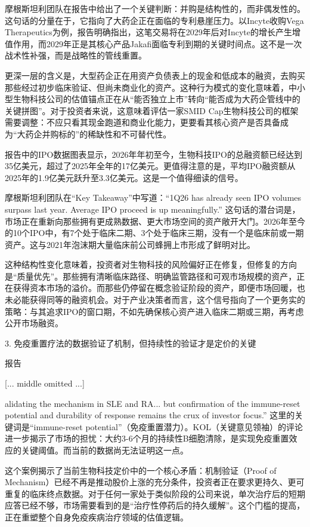 \documentclass[11pt]{ctexart}
\begin{document}
摩根斯坦利团队在报告中给出了一个关键判断：并购是结构性的，而非偶发性的。这句话的分量在于，它指向了大药企正在面临的专利悬崖压力。以Incyte收购Vega Therapeutics为例，报告明确指出，这笔交易将在2029年后对Incyte的增长产生增值作用，而2029年正是其核心产品Jakafi面临专利到期的关键时间点。这不是一次战术性补强，而是战略性的管线重置。

更深一层的含义是，大型药企正在用资产负债表上的现金和低成本的融资，去购买那些经过初步临床验证、但尚未商业化的资产。这种行为模式的变化意味着，中小型生物科技公司的估值锚点正在从“能否独立上市”转向“能否成为大药企管线中的关键拼图”。对于投资者来说，这意味着评估一家SMID Cap生物科技公司的框架需要调整：不应只看其现金跑道和商业化能力，更要看其核心资产是否具备成为“大药企并购标的”的稀缺性和不可替代性。

报告中的IPO数据图表显示，2026年年初至今，生物科技IPO的总融资额已经达到35亿美元，超过了2025年全年的17亿美元。更值得注意的是，平均IPO融资额从2025年的1.9亿美元跃升至3.3亿美元。这是一个值得细读的信号。

摩根斯坦利团队在“Key Takeaway”中写道：“1Q26 has already seen IPO volumes surpass last year. Average IPO proceed is up meaningfully.” 这句话的潜台词是，市场正在重新向那些拥有更成熟数据、更大市场空间的资产敞开大门。2026年至今的10个IPO中，有7个处于临床二期、3个处于临床三期，没有一个是临床前或一期资产。这与2021年泡沫期大量临床前公司蜂拥上市形成了鲜明对比。

这种结构性变化意味着，投资者对生物科技的风险偏好正在修复，但修复的方向是“质量优先”。那些拥有清晰临床路径、明确监管路径和可观市场规模的资产，正在获得资本市场的溢价。而那些仍停留在概念验证阶段的资产，即便市场回暖，也未必能获得同等的融资机会。对于产业决策者而言，这个信号指向了一个更务实的策略：与其追求IPO的窗口期，不如先确保核心资产进入临床二期或三期，再考虑公开市场融资。

3. 免疫重置疗法的数据验证了机制，但持续性的验证才是定价的关键

报告

[... middle omitted ...]

alidating the mechanism in SLE and RA... but confirmation of the immune-reset potential and durability of response remains the crux of investor focus.” 这里的关键词是“immune-reset potential”（免疫重置潜力）。KOL（关键意见领袖）的评论进一步揭示了市场的担忧：大约3-6个月的持续性B细胞清除，是实现免疫重置效应的关键阈值。而当前的数据尚无法证明这一点。

这个案例揭示了当前生物科技定价中的一个核心矛盾：机制验证（Proof of Mechanism）已经不再是推动股价上涨的充分条件，投资者正在要求更持久、更可重复的临床终点数据。对于任何一家处于类似阶段的公司来说，单次治疗后的短期应答已经不够，市场需要看到的是“治疗性停药后的持久缓解”。这个门槛的提高，正在重塑整个自身免疫疾病治疗领域的估值逻辑。
\end{document}
